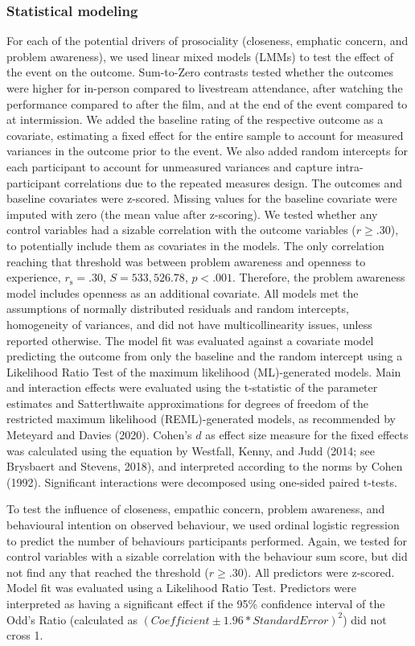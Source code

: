 \documentclass[
  man,floatsintext]{apa6}
\begin{document}
\subsubsection{Statistical modeling}\label{statistical-modeling}

For each of the potential drivers of prosociality (closeness, emphatic concern, and problem awareness), we used linear mixed models (LMMs) to test the effect of the event on the outcome. Sum-to-Zero contrasts tested whether the outcomes were higher for in-person compared to livestream attendance, after watching the performance compared to after the film, and at the end of the event compared to at intermission. We added the baseline rating of the respective outcome as a covariate, estimating a fixed effect for the entire sample to account for measured variances in the outcome prior to the event. We also added random intercepts for each participant to account for unmeasured variances and capture intra-participant correlations due to the repeated measures design. The outcomes and baseline covariates were z-scored. Missing values for the baseline covariate were imputed with zero (the mean value after z-scoring). We tested whether any control variables had a sizable correlation with the outcome variables (\(r \geq .30\)), to potentially include them as covariates in the models. The only correlation reaching that threshold was between problem awareness and openness to experience, \(r_{\mathrm{s}} = .30\), \(S = 533,526.78\), \(p < .001\). Therefore, the problem awareness model includes openness as an additional covariate. All models met the assumptions of normally distributed residuals and random intercepts, homogeneity of variances, and did not have multicollinearity issues, unless reported otherwise. The model fit was evaluated against a covariate model predicting the outcome from only the baseline and the random intercept using a Likelihood Ratio Test of the maximum likelihood (ML)-generated models. Main and interaction effects were evaluated using the t-statistic of the parameter estimates and Satterthwaite approximations for degrees of freedom of the restricted maximum likelihood (REML)-generated models, as recommended by Meteyard and Davies (2020). Cohen's \(d\) as effect size measure for the fixed effects was calculated using the equation by Westfall, Kenny, and Judd (2014; see Brysbaert and Stevens, 2018), and interpreted according to the norms by Cohen (1992). Significant interactions were decomposed using one-sided paired t-tests.

To test the influence of closeness, empathic concern, problem awareness, and behavioural intention on observed behaviour, we used ordinal logistic regression to predict the number of behaviours participants performed. Again, we tested for control variables with a sizable correlation with the behaviour sum score, but did not find any that reached the threshold (\(r \geq .30\)). All predictors were z-scored. Model fit was evaluated using a Likelihood Ratio Test. Predictors were interpreted as having a significant effect if the 95\% confidence interval of the Odd's Ratio (calculated as \((Coefficient \pm 1.96*Standard Error)^2\)) did not cross 1.
\end{document}
